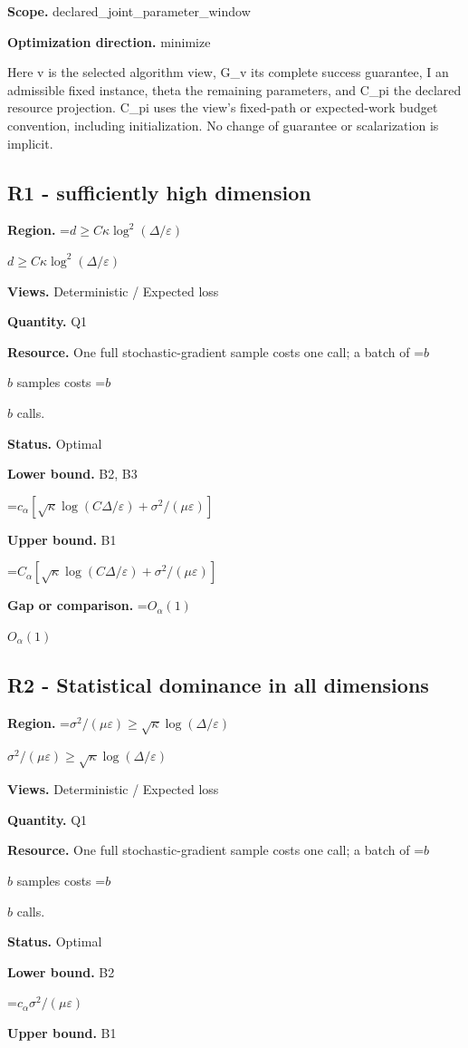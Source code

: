\documentclass[10pt,a4paper]{article}
\newcommand{\AtlasMath}[1]{\par\begingroup\centering\setbox0=\hbox{$\displaystyle #1$}\ifdim\wd0>1.4\linewidth\typeout{ATLAS WIDE FORMULA: \the\wd0}\fi\ifdim\wd0>\linewidth\resizebox{\linewidth}{!}{\box0}\else\box0\fi\par\endgroup}
\newcommand{\AtlasInlineMath}[1]{\begingroup\setbox0=\hbox{$#1$}\ifdim\wd0>.4\linewidth\endgroup\AtlasMath{#1}\else\endgroup$#1$\fi}
\begin{document}
\textbf{Scope.} declared\_joint\_parameter\_window

\textbf{Optimization direction.} minimize

Here v is the selected algorithm view, G\_v its complete success guarantee, I an admissible fixed instance, theta the remaining parameters, and C\_pi the declared resource projection. C\_pi uses the view's fixed-path or expected-work budget convention, including initialization. No change of guarantee or scalarization is implicit.

\subsection{R1 - sufficiently high dimension}
\textbf{Region.} \AtlasInlineMath{d\ge C\kappa\log^2(\Delta/\varepsilon)}

\textbf{Views.} Deterministic / Expected loss

\textbf{Quantity.} Q1

\textbf{Resource.} One full stochastic-gradient sample costs one call; a batch of \AtlasInlineMath{b} samples costs \AtlasInlineMath{b} calls.

\textbf{Status.} Optimal

\textbf{Lower bound.} B2, B3

\AtlasMath{c_\alpha[\sqrt\kappa\log(C\Delta/\varepsilon)+\sigma^2/(\mu\varepsilon)]}
\textbf{Upper bound.} B1

\AtlasMath{C_\alpha[\sqrt\kappa\log(C\Delta/\varepsilon)+\sigma^2/(\mu\varepsilon)]}
\textbf{Gap or comparison.} \AtlasInlineMath{O_\alpha(1)}

\subsection{R2 - Statistical dominance in all dimensions}
\textbf{Region.} \AtlasInlineMath{\sigma^2/(\mu\varepsilon)\ge \sqrt\kappa\log(\Delta/\varepsilon)}

\textbf{Views.} Deterministic / Expected loss

\textbf{Quantity.} Q1

\textbf{Resource.} One full stochastic-gradient sample costs one call; a batch of \AtlasInlineMath{b} samples costs \AtlasInlineMath{b} calls.

\textbf{Status.} Optimal

\textbf{Lower bound.} B2

\AtlasMath{c_\alpha \sigma^2/(\mu\varepsilon)}
\textbf{Upper bound.} B1
\end{document}
